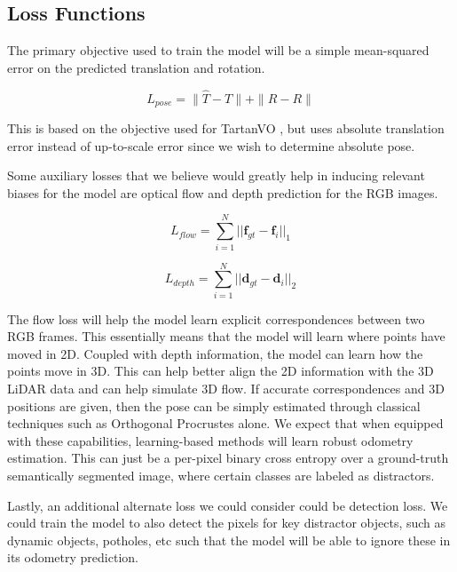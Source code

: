 \documentclass[11pt,a4paper]{article}
\begin{document}
\subsection{Loss Functions}

The primary objective used to train the model will be a simple mean-squared error on the predicted translation and rotation.

\begin{equation} \label{eq:sim1}
L_{pose} = \|\hat{T} - T\| + \|\hat{R} - R\|
\end{equation}

This is based on the objective used for TartanVO \cite{tartanvo}, but uses absolute translation error instead of up-to-scale error since we wish to determine absolute pose. 

Some auxiliary losses that we believe would greatly help in inducing relevant biases for the model are optical flow and depth prediction for the RGB images. 

\begin{equation}
    L_{flow} = \sum_{i=1}^{N}||\mathbf{f}_{gt} - \mathbf{f}_i||_1
\end{equation}

\begin{equation}
    L_{depth} = \sum_{i=1}^{N}||\mathbf{d}_{gt} - \mathbf{d}_i||_2
\end{equation}


The flow loss will help the model learn explicit correspondences between two RGB frames. This essentially means that the model will learn where points have moved in 2D. Coupled with depth information, the model can learn how the points move in 3D. This can help better align the 2D information with the 3D LiDAR data and can help simulate 3D flow. If accurate correspondences and 3D positions are given, then the pose can be simply estimated through classical techniques such as Orthogonal Procrustes alone. We expect that when equipped with these capabilities, learning-based methods will learn robust odometry estimation. This can just be a per-pixel binary cross entropy over a ground-truth semantically segmented image, where certain classes are labeled as distractors.

Lastly, an additional alternate loss we could consider could be detection loss. We could train the model to also detect the pixels for key distractor objects, such as dynamic objects, potholes, etc such that the model will be able to ignore these in its odometry prediction.
\end{document}
